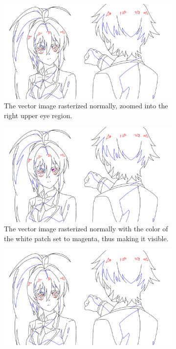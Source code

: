 \begin{figure}
    \centering
    \begin{subfigure}{\textwidth}
    \centering
        \includegraphics[width=\textwidth,trim={13em 15em 32em 12em},clip]{graphics/douga/39.pdf}
        \caption{The vector image rasterized normally, zoomed into the right upper eye region.}
    \end{subfigure}
    \begin{subfigure}{\textwidth}
        \includegraphics[width=\textwidth,trim={13em 15em 32em 12em},clip]{graphics/douga/39_magenta_patch.pdf}
        \caption{The vector image rasterized normally with the color of the white patch set to magenta, thus making it visible.}
    \end{subfigure}
    \begin{subfigure}{\textwidth}
        \includegraphics[width=\textwidth,trim={13em 15em 32em 12em},clip]{graphics/douga/39_patch_removed.pdf}

\end{subfigure}
\end{figure}
